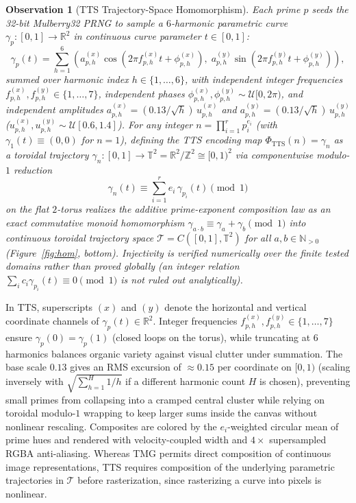 \documentclass[]{interact}
\theoremstyle{plain}
\newtheorem{observation}[theorem]{Observation}
\theoremstyle{definition}
\theoremstyle{remark}
\begin{document}
\begin{observation}[TTS Trajectory-Space Homomorphism]
Each prime $p$ seeds the 32-bit Mulberry32 PRNG to sample a $6$-harmonic parametric curve $\gamma_p : [0, 1] \to \mathbb{R}^2$ in continuous curve parameter $t \in [0, 1]$:
\[
  \gamma_p(t) = \sum_{h=1}^{6} \left( a_{p,h}^{(x)} \cos\!\left(2\pi f_{p,h}^{(x)} t + \phi_{p,h}^{(x)}\right),\; a_{p,h}^{(y)} \sin\!\left(2\pi f_{p,h}^{(y)} t + \phi_{p,h}^{(y)}\right) \right),
\]
summed over harmonic index $h \in \{1, \dots, 6\}$, with independent integer frequencies $f_{p,h}^{(x)}, f_{p,h}^{(y)} \in \{1,\dots,7\}$, independent phases $\phi_{p,h}^{(x)}, \phi_{p,h}^{(y)} \sim \mathcal{U}[0, 2\pi)$, and independent amplitudes $a_{p,h}^{(x)} = (0.13/\sqrt{h})\, u_{p,h}^{(x)}$ and $a_{p,h}^{(y)} = (0.13/\sqrt{h})\, u_{p,h}^{(y)}$ ($u_{p,h}^{(x)}, u_{p,h}^{(y)} \sim \mathcal{U}[0.6, 1.4]$). For any integer $n = \prod_{i=1}^{r} p_i^{e_i}$ (with $\gamma_1(t) \equiv (0, 0)$ for $n=1$), defining the TTS encoding map $\Phi_{\mathrm{TTS}}(n) = \gamma_n$ as a \emph{toroidal trajectory} $\gamma_n : [0, 1] \to \mathbb{T}^2 = \mathbb{R}^2 / \mathbb{Z}^2 \cong [0, 1)^2$ via componentwise modulo-$1$ reduction
\begin{equation}
  \gamma_n(t) \equiv \sum_{i=1}^{r} e_i\,\gamma_{p_i}(t) \pmod{1}
\end{equation}
on the flat $2$-torus \citep{munkres2000topology} realizes the additive prime-exponent composition law as an exact commutative monoid homomorphism $\gamma_{a\cdot b} \equiv \gamma_a + \gamma_b \pmod{1}$ into continuous toroidal trajectory space $\mathcal{T} = C([0,1], \mathbb{T}^2)$ for all $a, b \in \mathbb{N}_{>0}$ (Figure~\ref{fig:hom}, bottom). Injectivity is verified numerically over the finite tested domains rather than proved globally (an integer relation $\sum_i c_i \gamma_{p_i}(t) \equiv 0 \pmod{1}$ is not ruled out analytically).
\end{observation}
In TTS, superscripts $(x)$ and $(y)$ denote the horizontal and vertical coordinate channels of $\gamma_p(t) \in \mathbb{R}^2$. Integer frequencies $f_{p,h}^{(x)}, f_{p,h}^{(y)} \in \{1, \dots, 7\}$ ensure $\gamma_p(0) = \gamma_p(1)$ (closed loops on the torus), while truncating at $6$ harmonics balances organic variety against visual clutter under summation. The base scale $0.13$ gives an RMS excursion of $\approx 0.15$ per coordinate on $[0, 1)$ (scaling inversely with $\sqrt{\sum_{h=1}^{H} 1/h}$ if a different harmonic count $H$ is chosen), preventing small primes from collapsing into a cramped central cluster while relying on toroidal modulo-$1$ wrapping to keep larger sums inside the canvas without nonlinear rescaling. Composites are colored by the $e_i$-weighted circular mean of prime hues and rendered with velocity-coupled width and $4\times$ supersampled RGBA anti-aliasing. Whereas TMG permits direct composition of continuous image representations, TTS requires composition of the underlying parametric trajectories in $\mathcal{T}$ before rasterization, since rasterizing a curve into pixels is nonlinear.
\end{document}
